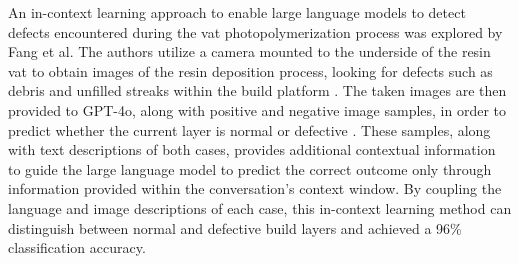 An in-context learning approach to enable large language models to detect
defects encountered during the vat photopolymerization process was explored by
Fang et al. \cite{fang_large_2024} The authors utilize a camera mounted to the
underside of the resin vat to obtain images of the resin deposition process,
looking for defects such as debris and unfilled streaks within the build
platform \cite{fang_large_2024}. The taken images are then provided to GPT-4o,
along with positive and negative image samples, in order to predict whether the
current layer is normal or defective \cite{fang_large_2024}. These samples,
along with text descriptions of both cases, provides additional contextual
information to guide the large language model to predict the correct outcome
only through information provided within the conversation's context window. By
coupling the language and image descriptions of each case, this in-context
learning method can distinguish between normal and defective build layers and
achieved a 96\% classification accuracy\cite{fang_large_2024}.

